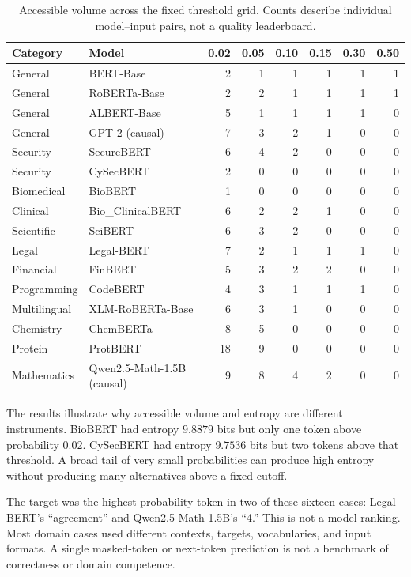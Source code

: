 \documentclass[11pt,a4paper]{article}
\begin{document}
\begin{table}[h]
\centering
\caption{Accessible volume across the fixed threshold grid. Counts describe individual model--input pairs, not a quality leaderboard.}
\label{tab:model-comparison}
{\scriptsize
\setlength{\tabcolsep}{4pt}
\begin{tabular}{llrrrrrr}
\toprule
Category & Model & 0.02 & 0.05 & 0.10 & 0.15 & 0.30 & 0.50 \\
\midrule
General & BERT-Base & 2 & 1 & 1 & 1 & 1 & 1 \\
General & RoBERTa-Base & 2 & 2 & 1 & 1 & 1 & 1 \\
General & ALBERT-Base & 5 & 1 & 1 & 1 & 1 & 0 \\
General & GPT-2 (causal) & 7 & 3 & 2 & 1 & 0 & 0 \\
Security & SecureBERT & 6 & 4 & 2 & 0 & 0 & 0 \\
Security & CySecBERT & 2 & 0 & 0 & 0 & 0 & 0 \\
Biomedical & BioBERT & 1 & 0 & 0 & 0 & 0 & 0 \\
Clinical & Bio\_ClinicalBERT & 6 & 2 & 2 & 1 & 0 & 0 \\
Scientific & SciBERT & 6 & 3 & 2 & 0 & 0 & 0 \\
Legal & Legal-BERT & 7 & 2 & 1 & 1 & 1 & 0 \\
Financial & FinBERT & 5 & 3 & 2 & 2 & 0 & 0 \\
Programming & CodeBERT & 4 & 3 & 1 & 1 & 1 & 0 \\
Multilingual & XLM-RoBERTa-Base & 6 & 3 & 1 & 0 & 0 & 0 \\
Chemistry & ChemBERTa & 8 & 5 & 0 & 0 & 0 & 0 \\
Protein & ProtBERT & 18 & 9 & 0 & 0 & 0 & 0 \\
Mathematics & Qwen2.5-Math-1.5B (causal) & 9 & 8 & 4 & 2 & 0 & 0 \\
\bottomrule
\end{tabular}
}
\end{table}

The results illustrate why accessible volume and entropy are different instruments. BioBERT had entropy $9.8879$ bits but only one token above probability 0.02. CySecBERT had entropy $9.7536$ bits but two tokens above that threshold. A broad tail of very small probabilities can produce high entropy without producing many alternatives above a fixed cutoff.

The target was the highest-probability token in two of these sixteen cases: Legal-BERT's ``agreement'' and Qwen2.5-Math-1.5B's ``4.'' This is not a model ranking. Most domain cases used different contexts, targets, vocabularies, and input formats. A single masked-token or next-token prediction is not a benchmark of correctness or domain competence.
\end{document}
